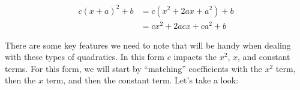 

\begin{equation}\label{eqn:complete_square_variation2}
	\begin{split}
		c(x+a)^2 + b & = c(x^2 + 2ax + a^2) + b \\
			     & = cx^2 + 2acx + ca^2 +b
	\end{split}
\end{equation}

There are some key features we need to note that will be handy when dealing with these types of quadratics. In this form $c$ impacts the $x^2$, $x$, and constant terms. For this form, we will start by ``matching'' coefficients with the $x^2$ term, then the $x$ term, and then the constant term. Let's take a look:






